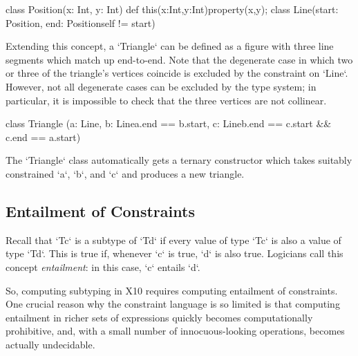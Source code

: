 % 
\begin{xten}
class Position(x: Int, y: Int) {
   def this(x:Int,y:Int){property(x,y);}
   }
class Line(start: Position, 
           end: Position{self != start}) {}
\end{xten}


Extending this concept, a \xcd`Triangle` can be defined as a figure with three
line segments which match up end-to-end.  Note that the degenerate case in
which two or three of the triangle's vertices coincide is excluded by the
constraint on \xcd`Line`.  However, not all degenerate cases can be excluded
by the type system; in particular, it is impossible to check that the three
vertices are not collinear. 

% 
\begin{xten}
class Triangle 
 (a: Line, 
  b: Line{a.end == b.start}, 
  c: Line{b.end == c.start && c.end == a.start})  
 {
 }
\end{xten}
%

The \xcd`Triangle` class automatically gets a ternary constructor which takes
suitably constrained \xcd`a`, \xcd`b`, and \xcd`c` and produces a new
triangle. 


\subsection{Entailment of Constraints}


Recall that \xcd`T{c}` is a subtype of \xcd`T{d}` if every value of type
\xcd`T{c}` is also a value of type \xcd`T{d}`.  This is true if, whenever
\xcd`c` is true, \xcd`d` is also true.  Logicians call this concept {\em
entailment}: in this case, \xcd`c` entails \xcd`d`.  

So, computing subtyping in X10 requires computing entailment of constraints.
One crucial reason why the constraint language is so limited is that computing
entailment in richer sets of expressions quickly becomes computationally
prohibitive, and, with a small number of innocuous-looking operations, becomes
actually undecidable.  



